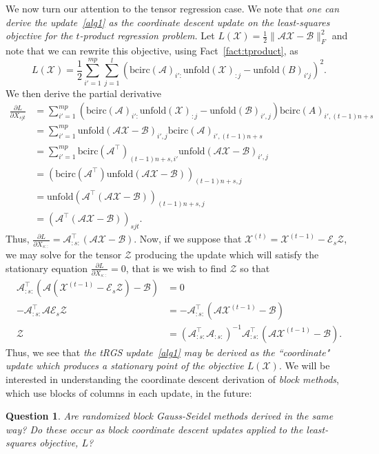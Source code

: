 \documentclass[10.5pt]{amsart}
\newtheorem{question}{Question}
\newcommand{\tens}[1]{\bm{\mathcal{#1}}}
\def\tA{{\tens{A}}}  %
\def\tB{{\tens{B}}}  %
\def\tE{{\tens{E}}}
\def\tX{{\tens{X}}}  %
\def\tZ{{\tens{Z}}}
\def\bcirc{{\text{bcirc}}}
\def\unfold{{\text{unfold}}}
\begin{document}
We now turn our attention to the tensor regression case.  We note that \emph{one can derive the update~\eqref{alg1} as the coordinate descent update on the least-squares objective for the $t$-product regression problem.}  Let $L(\tens{X}) = \frac12 \|\tens{A} \tens{X} - \tens{B}\|_F^2$ and note that we can rewrite this objective, using Fact~\ref{fact:tproduct}, as $$L(\tens{X}) = \frac12 \sum_{i' = 1}^{mp} \sum_{j=1}^l (\bcirc(\tA)_{i':} \unfold(\tX)_{:j} - \unfold(B)_{i' j})^2.$$  We then derive the partial derivative 
\begin{align*}
    \frac{\partial L}{\partial X_{sjt}} &= \sum_{i' = 1}^{mp} (\bcirc(\tA)_{i' :} \unfold(\tX)_{:j} - \unfold(\tB)_{i', j}) \bcirc(A)_{i', (t-1)n+s}\\
    &= \sum_{i' = 1}^{mp} \unfold(\tA \tX - \tB)_{i', j} \bcirc(\tA)_{i', (t-1)n+s}\\
    &= \sum_{i' = 1}^{mp} \bcirc(\tA^\top)_{(t-1)n+s, i'} \unfold(\tA \tX - \tB)_{i', j}\\
    &= (\bcirc(\tA^\top) \unfold(\tA \tX - \tB))_{(t-1)n+s, j}\\
    &= \unfold(\tA^\top (\tA \tX - \tB))_{(t-1)n+s, j}\\ 
    &= (\tA^\top (\tA \tX - \tB))_{sjt}.
\end{align*}
Thus, $\frac{\partial L}{\partial X_{s::}} = \tA_{:s:}^\top (\tA \tX - \tB)$.  Now, if we suppose that $\tX^{(t)} = \tX^{(t-1)} - \tE_s \tZ$, we may solve for the tensor $\tZ$ producing the update which will satisfy the stationary equation $\frac{\partial L}{\partial X_{s::}} = 0$, that is we wish to find $\tZ$ so that 
\begin{align*}
    \tA_{:s:}^\top (\tA (\tX^{(t-1)} - \tE_s \tZ) - \tB) &= 0 \\
    -\tA_{:s:}^\top \tA \tE_s \tZ &= -\tA_{:s:}^\top (\tA \tX^{(t-1)} - \tB)\\
    \tZ &= (\tA_{:s:}^\top \tA_{:s:})^{-1} \tA_{:s:}^\top (\tA \tX^{(t-1)} - \tB).
\end{align*}
Thus, we see that \emph{the tRGS update~\ref{alg1} may be derived as the ``coordinate" update which produces a stationary point of the objective $L(\tX)$}.  We will be interested in understanding the coordinate descent derivation of \emph{block methods}, which use blocks of columns in each update, in the future:

\begin{question}
    Are randomized \emph{block} Gauss-Seidel methods derived in the same way?  Do these occur as block coordinate descent updates applied to the least-squares objective, $L$? \label{ques:block coordinate descent}
\end{question}
\end{document}
